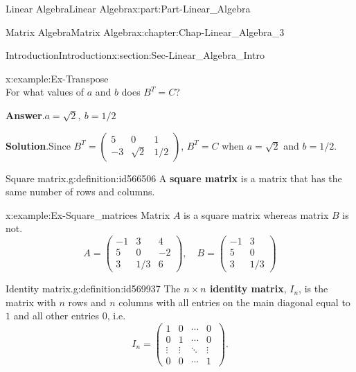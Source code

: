 \documentclass[oneside,10pt,]{book}
\newcommand{\blocktitlefont}{\relax}
\newcommand{\terminology}[1]{\textbf{#1}}
\numberwithin{equation}{section}
\newcommand{\amp}{&}
\begin{document}
\begin{partptx}{Linear Algebra}{}{Linear Algebra}{}{}{x:part:Part-Linear_Algebra}
\begin{chapterptx}{Matrix Algebra}{}{Matrix Algebra}{}{}{x:chapter:Chap-Linear_Algebra_3}
\begin{sectionptx}{Introduction}{}{Introduction}{}{}{x:section:Sec-Linear_Algebra_Intro}
\begin{example}{}{x:example:Ex-Transpose}
\begin{equation*}
\end{equation*}
For what values of \(a\) and \(b\) does \(B^T=C\)?%
\par\smallskip%
\noindent\textbf{\blocktitlefont Answer}.\hypertarget{g:answer:id566479}{}\quad{}\(a=\sqrt{2}, \ b=1/2\)\par\smallskip%
\noindent\textbf{\blocktitlefont Solution}.\hypertarget{g:solution:id566492}{}\quad{}Since \(B^T = \begin{pmatrix} 5 \amp 0 \amp 1\\ -3 \amp \sqrt{2} \amp 1/2\end{pmatrix}\), \(B^T = C\) when \(a=\sqrt{2}\) and \(b=1/2\).\end{example}
\begin{definition}{Square matrix.}{g:definition:id566506}%
A \terminology{square matrix} is a matrix that has the same number of rows and columns.\end{definition}
\begin{example}{}{x:example:Ex-Square_matrices}%
Matrix \(A\) is a square matrix whereas matrix \(B\) is not.%
\begin{equation*}
A = \begin{pmatrix}-1 \amp 3 \amp 4\\ 5 \amp 0 \amp -2 \\ 3 \amp 1/3 \amp 6 \end{pmatrix}, \quad B = \begin{pmatrix} -1 \amp 3 \\ 5 \amp 0 \\ 3 \amp 1/3\end{pmatrix}
\end{equation*}
%
\end{example}
\begin{definition}{Identity matrix.}{g:definition:id569937}%
The \terminology{\(n \times n\) identity matrix}, \terminology{\(I_n\)}, is the matrix with \(n\) rows and \(n\) columns with all entries on the main diagonal equal to \(1\) and all other entries \(0\), i.e.%
\begin{equation*}
I_n = \begin{pmatrix}
1 \amp 0 \amp  \cdots \amp 0\\
0 \amp 1 \amp \cdots \amp 0\\
\vdots \amp \vdots \amp \ddots \amp \vdots\\
0\amp 0 \amp \cdots \amp 1\
\end{pmatrix}.
\end{equation*}
\end{definition}

\end{sectionptx}
\end{chapterptx}
\end{partptx}
\end{document}
